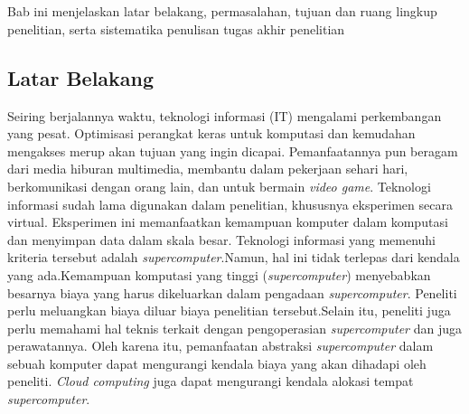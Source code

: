 
\chapter{\babSatu}
Bab ini menjelaskan latar belakang, permasalahan, tujuan dan ruang lingkup 
penelitian, serta sistematika penulisan tugas akhir penelitian 

\section{Latar Belakang}
Seiring berjalannya waktu, teknologi informasi (IT) mengalami perkembangan yang
pesat. Optimisasi perangkat keras untuk komputasi dan kemudahan mengakses merup
akan tujuan yang ingin dicapai. Pemanfaatannya pun beragam dari media hiburan multimedia, membantu dalam
pekerjaan sehari hari, berkomunikasi dengan orang lain, dan untuk bermain \textit{video game}.
Teknologi informasi sudah lama digunakan dalam penelitian, khususnya eksperimen secara virtual. Eksperimen ini memanfaatkan kemampuan komputer dalam komputasi dan menyimpan data dalam skala besar. Teknologi informasi yang memenuhi kriteria tersebut adalah \textit{supercomputer}.Namun, hal ini tidak terlepas dari kendala yang ada.Kemampuan komputasi yang tinggi (\textit{supercomputer}) menyebabkan besarnya biaya yang harus dikeluarkan dalam pengadaan \textit{supercomputer}.
Peneliti perlu meluangkan biaya diluar biaya penelitian tersebut.Selain itu, 
peneliti juga perlu memahami hal teknis terkait dengan pengoperasian \textit{supercomputer} dan juga perawatannya. Oleh karena itu, pemanfaatan abstraksi \textit{supercomputer} dalam sebuah komputer dapat mengurangi kendala biaya yang akan dihadapi oleh peneliti. \textit{Cloud computing} juga dapat mengurangi kendala alokasi tempat \textit{supercomputer}.

